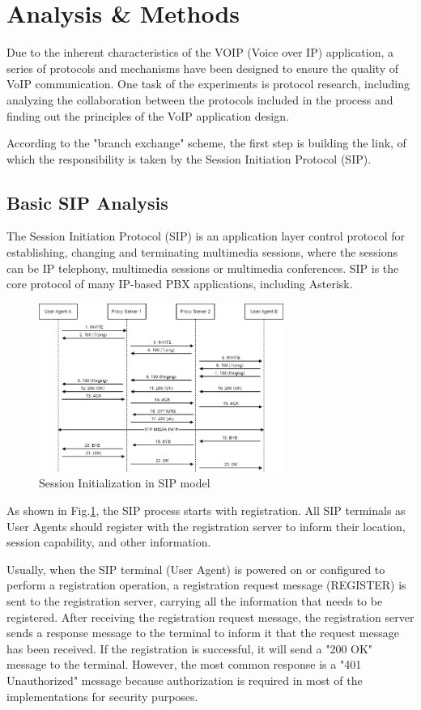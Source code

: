 \section{Analysis \& Methods}	\label{sec:analysis-methods}
Due to the inherent characteristics of the VOIP (Voice over IP) application, a series of protocols and mechanisms have been designed to ensure the quality of VoIP communication. One task of the experiments is protocol research, including analyzing the collaboration between the protocols included in the process and finding out the principles of the VoIP application design.

According to the "branch exchange" scheme, the first step is building the link, of which the responsibility is taken by the Session Initiation Protocol (SIP).


\subsection{Basic SIP Analysis}
The Session Initiation Protocol (SIP) is an application layer control protocol for establishing, changing and terminating multimedia sessions, where the sessions can be IP telephony, multimedia sessions or multimedia conferences. SIP is the core protocol of many IP-based PBX applications, including Asterisk.

\begin{figure}[htbp]
	\centerline{\includegraphics[width=8cm]{Images/experiment/SIP.png}}
	\caption{Session Initialization in SIP model}
	\label{fig:sip}
\end{figure}



As shown in Fig.\ref{fig:sip}, the SIP process starts with registration. All SIP terminals as User Agents should register with the registration server to inform their location, session capability, and other information.

Usually, when the SIP terminal (User Agent) is powered on or configured to perform a registration operation, a registration request message (REGISTER) is sent to the registration server, carrying all the information that needs to be registered. After receiving the registration request message, the registration server sends a response message to the terminal to inform it that the request message has been received. If the registration is successful, it will send a "200 OK" message to the terminal. However, the most common response is a "401 Unauthorized" message because authorization is required in most of the implementations for security purposes. 


